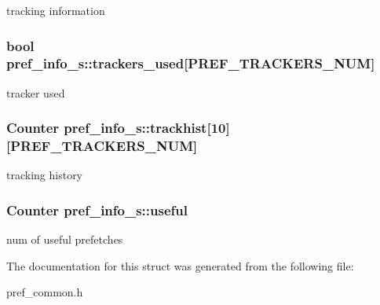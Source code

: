 \label{structpref__info__s_a98609e4e7376f3fae20054c99feee11a}
tracking information \hypertarget{structpref__info__s_a3c85c80bea8f5a3acbeb18316d8c912d}{
\subsubsection[{trackers\_\-used}]{\setlength{\rightskip}{0pt plus 5cm}bool {\bf pref\_\-info\_\-s::trackers\_\-used}\mbox{[}PREF\_\-TRACKERS\_\-NUM\mbox{]}}}
\label{structpref__info__s_a3c85c80bea8f5a3acbeb18316d8c912d}
tracker used \hypertarget{structpref__info__s_aa709dbfe970425b137e63b8376792392}{
\subsubsection[{trackhist}]{\setlength{\rightskip}{0pt plus 5cm}Counter {\bf pref\_\-info\_\-s::trackhist}\mbox{[}10\mbox{]}\mbox{[}PREF\_\-TRACKERS\_\-NUM\mbox{]}}}
\label{structpref__info__s_aa709dbfe970425b137e63b8376792392}
tracking history \hypertarget{structpref__info__s_a9b968c9aebf995d652f9f967eb7e5971}{
\subsubsection[{useful}]{\setlength{\rightskip}{0pt plus 5cm}Counter {\bf pref\_\-info\_\-s::useful}}}
\label{structpref__info__s_a9b968c9aebf995d652f9f967eb7e5971}
num of useful prefetches 

The documentation for this struct was generated from the following file:\begin{DoxyCompactItemize}
\item 
pref\_\-common.h\end{DoxyCompactItemize}
